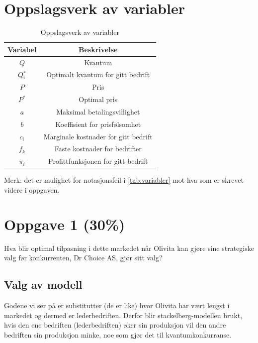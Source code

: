 \documentclass[
  12pt,
  a4paper,
  DIV=11,
  numbers=noendperiod]{scrartcl}
\renewcommand*\contentsname{Table of contents}
\newcommand\contentsname{Table of contents}
\begin{document}
\newpage
\hypersetup{linkcolor=black}
\renewcommand{\contentsname}{Innholdsfortegnelse}
\renewcommand*{\figureautorefname}{Figur}
\renewcommand*{\tableautorefname}{Tabell}
\tableofcontents
\newpage
\listoffigures
\listoftables
\hypersetup{linkcolor=blue}
\newpage

\section{Oppslagsverk av variabler}\label{oppslagsverk-av-variabler}

\begin{table}[h]
\centering
\begin{tabular}{|c|c|}
\hline
Variabel & Beskrivelse \\ \hline
$Q$ & Kvantum \\ \hline
$Q{_i^*}$ & Optimalt kvantum for gitt bedrift \\ \hline
$P$ & Pris  \\ \hline
$P^*$ & Optimal pris \\ \hline
$a$ & Maksimal betalingsvillighet \\ \hline
$b$ & Koeffisient for prisfølsomhet \\ \hline
$c_i$ & Marginale kostnader for gitt bedrift \\ \hline
$f_k$ & Faste kostnader for bedrifter \\ \hline
$\pi_i$ & Profittfunksjonen for gitt bedrift \\ \hline
\end{tabular}
\caption{Oppslagsverk av variabler}
\label{tab:variabler}
\end{table}

Merk: det er mulighet for notasjonsfeil i \autoref{tab:variabler} mot
hva som er skrevet videre i oppgaven.

\section{Oppgave 1 (30\%)}\label{oppgave-1-30}

Hva blir optimal tilpasning i dette markedet når Olivita kan gjøre sine
strategiske valg før konkurrenten, Dr Choice AS, gjør sitt valg?

\subsection{Valg av modell}\label{valg-av-modell}

Godene vi ser på er substitutter (de er like) hvor Olivita har vært
lengst i markedet og dermed er lederbedriften. Derfor blir
stackelberg-modellen brukt, hvis den ene bedriften (lederbedriften) øker
sin produksjon vil den andre bedriften sin produksjon minke, noe som
gjør det til kvantumkonkurranse.
\end{document}
